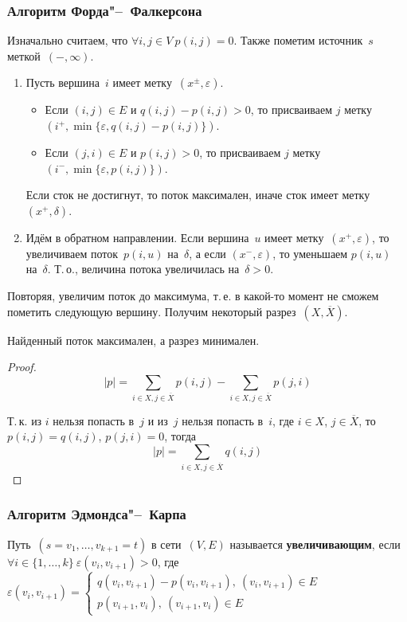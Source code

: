 \subsubsection{Алгоритм Форда"--~Фалкерсона}
Изначально считаем, что $\forall i, j \in V \ p(i, j) = 0$.
Также пометим источник~$s$ меткой~$(-, \infty)$.
\begin{enumerate}
	\item Пусть вершина~$i$ имеет метку~$(x^\pm, \varepsilon)$.
	\begin{itemize}
		\item Если $(i, j) \in E$ и $q(i, j) - p(i, j) > 0$, то присваиваем $j$ метку~$(i^+, \min \{\varepsilon, q(i, j) - p(i, j)\})$.
		\item Если $(j, i) \in E$ и $p(i, j) > 0$, то присваиваем $j$ метку~$(i^-, \min \{\varepsilon, p(i, j)\})$.
	\end{itemize}
	
	Если сток не достигнут, то поток максимален, иначе сток имеет метку$(x^+, \delta)$.
	
	\item Идём в обратном направлении.
	Если вершина~$u$ имеет метку~$(x^+, \varepsilon)$, то увеличиваем поток~$p(i, u)$ на~$\delta$, а если $(x^-, \varepsilon)$, то уменьшаем $p(i, u)$ на~$\delta$.
	Т.\,о., величина потока увеличилась на~$\delta > 0$.
\end{enumerate}

Повторяя, увеличим поток до максимума, т.\,е. в какой-то момент не сможем пометить следующую вершину.
Получим некоторый разрез~$(X, \overline X)$.

\begin{lemma}
Найденный поток максимален, а разрез минимален.
\end{lemma}
\begin{proof}
\begin{equation*}
|p| = \sum_{i \in X, j \in \overline X} p(i, j) - \sum_{i \in X, j \in \overline X} p(j, i)
\end{equation*}

Т.\,к. из $i$ нельзя попасть в~$j$ и из~$j$ нельзя попасть в~$i$, где $i \in X$, $j \in \overline X$, то $p(i, j) = q(i, j)$, $p(j, i) = 0$, тогда
\begin{equation*}
|p| = \sum_{i \in X, j \in \overline X} q(i, j)
\end{equation*}
\end{proof}

\subsubsection{Алгоритм Эдмондса"--~Карпа}
Путь~$(s = v_1, \ldots, v_{k+1} = t)$ в сети~$(V, E)$ называется \textbf{увеличивающим}, если $\forall i \in \{ 1, \ldots, k \} \ \varepsilon(v_i, v_{i+1}) > 0$, где $\varepsilon(v_i, v_{i+1}) = \begin{cases}
q(v_i, v_{i+1}) - p(v_i, v_{i+1}), \ (v_i, v_{i+1}) \in E \\
p(v_{i+1}, v_i), \ (v_{i+1}, v_i) \in E
\end{cases}$

